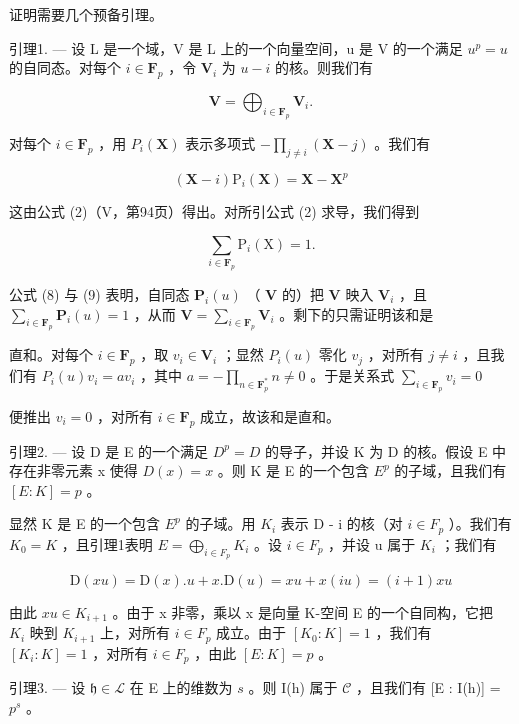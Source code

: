 证明需要几个预备引理。

引理1. --- 设 L 是一个域，V 是 L 上的一个向量空间，u 是 V 的一个满足 \(u^p = u\) 的自同态。对每个 \(i \in \mathbf{F}_p\) ，令 \(\mathbf{V}_i\) 为 \(u - i\) 的核。则我们有

\[
\mathbf {V} = \bigoplus_ {i \in \mathbf {F} _ {p}} \mathbf {V} _ {i}.
\]

对每个 \(i \in \mathbf{F}_p\) ，用 \(P_i(\mathbf{X})\) 表示多项式 \(-\prod_{j \neq i} (\mathbf{X} - j)\) 。我们有

\[
(\mathbf {X} - i) \mathrm{P} _ {i} (\mathbf {X}) = \mathbf {X} - \mathbf {X} ^ {p}\tag{8}
\]

这由公式 (2)（V，第94页）得出。对所引公式 (2) 求导，我们得到

\[
\sum_ {i \in \mathbf {F} _ {p}} \mathrm{P} _ {i} (\mathrm{X}) = 1.\tag{9}
\]

公式 (8) 与 (9) 表明，自同态 \(\mathbf{P}_i(u)\) （ \(\mathbf{V}\) 的）把 \(\mathbf{V}\) 映入 \(\mathbf{V}_i\) ，且 \(\sum_{i\in \mathbf{F}_p}\mathbf{P}_i(u) = 1\) ，从而 \(\mathbf{V} = \sum_{i\in \mathbf{F}_p}\mathbf{V}_i\) 。剩下的只需证明该和是

直和。对每个 \(i \in \mathbf{F}_p\) ，取 \(v_i \in \mathbf{V}_i\) ；显然 \(P_i(u)\) 零化 \(v_j\) ，对所有 \(j \neq i\) ，且我们有 \(P_i(u) v_i = av_i\) ，其中 \(a = -\prod_{n \in \mathbf{F}_p^*} n \neq 0\) 。于是关系式 \(\sum_{i \in \mathbf{F}_p} v_i = 0\)

便推出 \(v_{i} = 0\) ，对所有 \(i \in \mathbf{F}_p\) 成立，故该和是直和。

引理2. --- 设 D 是 E 的一个满足 \(D^{p} = D\) 的导子，并设 K 为 D 的核。假设 E 中存在非零元素 x 使得 \(D(x) = x\) 。则 K 是 E 的一个包含 \(E^{p}\) 的子域，且我们有 \([E : K] = p\) 。

显然 K 是 E 的一个包含 \(E^{p}\) 的子域。用 \(K_{i}\) 表示 D - i 的核（对 \(i \in F_{p}\) ）。我们有 \(K_{0} = K\) ，且引理1表明 \(E = \bigoplus_{i \in F_{p}} K_{i}\) 。设 \(i \in F_{p}\) ，并设 u 属于 \(K_{i}\) ；我们有

\[
\mathrm{D} (x u) = \mathrm{D} (x). u + x. \mathrm{D} (u) = x u + x (i u) = (i + 1) x u
\]

由此 \(xu \in K_{i+1}\) 。由于 x 非零，乘以 x 是向量 K-空间 E 的一个自同构，它把 \(K_i\) 映到 \(K_{i+1}\) 上，对所有 \(i \in F_p\) 成立。由于 \([K_0 : K] = 1\) ，我们有 \([K_i : K] = 1\) ，对所有 \(i \in F_p\) ，由此 \([E : K] = p\) 。

引理3. --- 设 \(\mathfrak{h} \in \mathcal{L}\) 在 E 上的维数为 \(s\) 。则 I(h) 属于 \(\mathcal{C}\) ，且我们有 {[}E : I(h){]} = \(p^s\) 。

